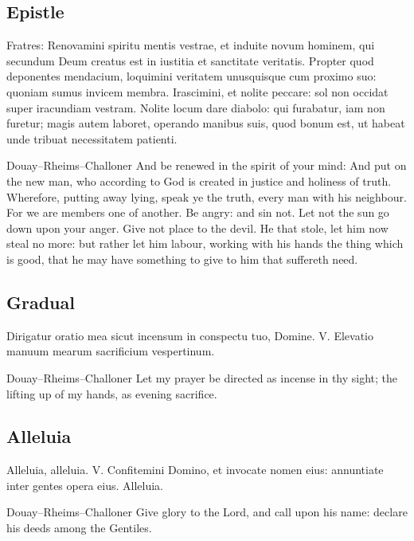 \subsection{Epistle}\label{proper-epistle}
\begin{latinproper}
Fratres: Renovamini spiritu mentis vestrae, et induite novum hominem, qui secundum Deum creatus est in iustitia et sanctitate veritatis. Propter quod deponentes mendacium, loquimini veritatem unusquisque cum proximo suo: quoniam sumus invicem membra. Irascimini, et nolite peccare: sol non occidat super iracundiam vestram. Nolite locum dare diabolo: qui furabatur, iam non furetur; magis autem laboret, operando manibus suis, quod bonum est, ut habeat unde tribuat necessitatem patienti.
\end{latinproper}
\begin{englishwitness}{Douay--Rheims--Challoner}
And be renewed in the spirit of your mind: And put on the new man, who according to God is created in justice and holiness of truth. Wherefore, putting away lying, speak ye the truth, every man with his neighbour. For we are members one of another. Be angry: and sin not. Let not the sun go down upon your anger. Give not place to the devil. He that stole, let him now steal no more: but rather let him labour, working with his hands the thing which is good, that he may have something to give to him that suffereth need.
\end{englishwitness}

\subsection{Gradual}\label{proper-gradual}
\begin{latinproper}
Dirigatur oratio mea sicut incensum in conspectu tuo, Domine. V. Elevatio manuum mearum sacrificium vespertinum.
\end{latinproper}
\begin{englishwitness}{Douay--Rheims--Challoner}
Let my prayer be directed as incense in thy sight; the lifting up of my hands, as evening sacrifice.
\end{englishwitness}

\subsection{Alleluia}\label{proper-alleluia}
\begin{latinproper}
Alleluia, alleluia. V. Confitemini Domino, et invocate nomen eius: annuntiate inter gentes opera eius. Alleluia.
\end{latinproper}
\begin{englishwitness}{Douay--Rheims--Challoner}
Give glory to the Lord, and call upon his name: declare his deeds among the Gentiles.
\end{englishwitness}

